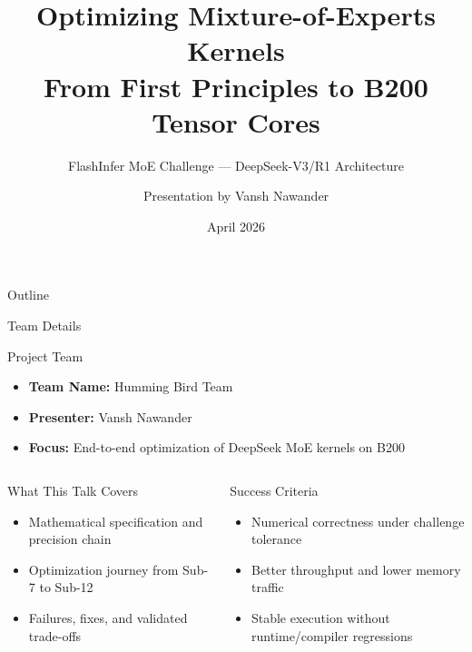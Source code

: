 \documentclass[aspectratio=169,11pt]{beamer}
\title[MoE Kernel Optimization]{\textbf{Optimizing Mixture-of-Experts Kernels}\\
\large From First Principles to B200 Tensor Cores}
\subtitle{FlashInfer MoE Challenge --- DeepSeek-V3/R1 Architecture}
\author[V. Nawander]{Presentation by Vansh Nawander}
\date{April 2026}
\institute[Humming Bird Team]{Humming Bird Team \\ GPU Kernel Engineering}
\begin{document}
\begin{frame}
\titlepage
\end{frame}

\begin{frame}{Outline}
\tableofcontents
\end{frame}

\begin{frame}{Team Details}
\begin{block}{Project Team}
\begin{itemize}
    \item \textbf{Team Name:} Humming Bird Team
    \item \textbf{Presenter:} Vansh Nawander
    \item \textbf{Focus:} End-to-end optimization of DeepSeek MoE kernels on B200
\end{itemize}
\end{block}

\begin{columns}[T]
\begin{exampleblock}{What This Talk Covers}
\begin{itemize}
    \item Mathematical specification and precision chain
    \item Optimization journey from Sub-7 to Sub-12
    \item Failures, fixes, and validated trade-offs
\end{itemize}
\end{exampleblock}

\begin{alertblock}{Success Criteria}
\begin{itemize}
    \item Numerical correctness under challenge tolerance
    \item Better throughput and lower memory traffic
    \item Stable execution without runtime/compiler regressions
\end{itemize}
\end{alertblock}
\end{columns}
\end{frame}
\end{document}
